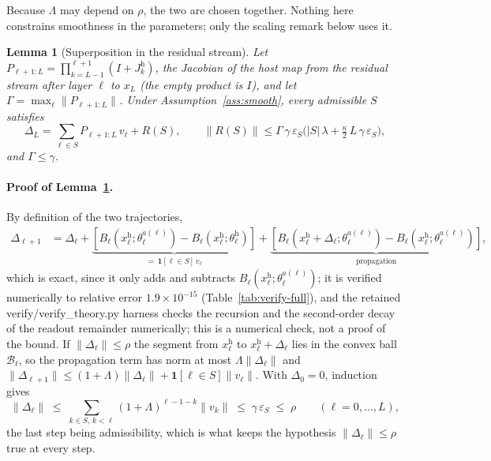 \documentclass{article}
\newcommand{\artifact}[1]{\textsf{#1}}
\theoremstyle{plain}
\newtheorem{lemma}[theorem]{Lemma}
\theoremstyle{definition}
\theoremstyle{remark}
\newcommand{\host}{\mathrm{h}}
\begin{document}
Because $\Lambda$ may depend on $\rho$, the two are chosen together. Nothing
here constrains smoothness in the parameters; only the scaling remark below uses
it.

\begin{lemma}[Superposition in the residual stream]
\label{lem:state}
Let $P_{\ell+1:L}=\prod_{k=L-1}^{\ell+1}\left(I+J^{\host}_k\right)$, the
Jacobian of the host map from the residual stream after layer $\ell$ to $x_L$
(the empty product is $I$), and let $\Gamma=\max_\ell\|P_{\ell+1:L}\|$. Under
Assumption~\ref{ass:smooth}, every admissible $S$ satisfies
\[
\Delta_L=\sum_{\ell\in S}P_{\ell+1:L}\,v_\ell+R(S),
\qquad
\|R(S)\|\le\Gamma\,\gamma\,\varepsilon_S\Big(|S|\,\lambda+\tfrac{\kappa}{2}\,L\,\gamma\,\varepsilon_S\Big),
\]
and $\Gamma\le\gamma$.
\end{lemma}

\paragraph{Proof of Lemma~\ref{lem:state}.}
By definition of the two trajectories,
\begin{align}
\Delta_{\ell+1}
&= \Delta_\ell
+ \underbrace{\left[B_\ell\!\left(x^{\host}_\ell;\theta^{a(\ell)}_\ell\right) - B_\ell\!\left(x^{\host}_\ell;\theta^{\host}_\ell\right)\right]}_{=\,\mathbf{1}[\ell\in S]\, v_\ell}
+ \underbrace{\left[B_\ell\!\left(x^{\host}_\ell+\Delta_\ell;\theta^{a(\ell)}_\ell\right) - B_\ell\!\left(x^{\host}_\ell;\theta^{a(\ell)}_\ell\right)\right]}_{\text{propagation}},
\end{align}
which is exact, since it only adds and subtracts
$B_\ell(x^{\host}_\ell;\theta^{a(\ell)}_\ell)$; it is verified numerically to
relative error $1.9\times10^{-15}$ (Table~\ref{tab:verify-full}), and
the retained \artifact{verify/verify\_theory.py} harness checks the recursion
and the second-order decay of the readout remainder numerically; this is a
numerical check, not a proof of the bound. If
$\|\Delta_\ell\|\le\rho$ the segment from $x^{\host}_\ell$ to
$x^{\host}_\ell+\Delta_\ell$ lies in the convex ball $\mathcal{B}_\ell$, so the
propagation term has norm at most $\Lambda\|\Delta_\ell\|$ and
$\|\Delta_{\ell+1}\|\le(1+\Lambda)\|\Delta_\ell\|+\mathbf{1}[\ell\in S]\|v_\ell\|$.
With $\Delta_0=0$, induction gives
\begin{equation}
\label{eq:apriori}
\|\Delta_\ell\| \;\le\; \sum_{k\in S,\, k<\ell} (1+\Lambda)^{\ell-1-k}\|v_k\| \;\le\; \gamma\,\varepsilon_S \;\le\; \rho
\qquad (\ell=0,\dots,L),
\end{equation}
the last step being admissibility, which is what keeps the hypothesis
$\|\Delta_\ell\|\le\rho$ true at every step.
\end{document}
